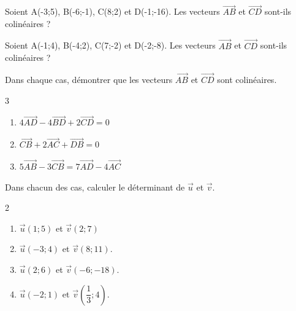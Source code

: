 {\begin{Exercice}
Soient A(-3;5), B(-6;-1), C(8;2) et D(-1;-16).
Les vecteurs $ \overrightarrow{AB} $ et $ \overrightarrow{CD} $ sont-ils colinéaires ?
\end{Exercice}



\begin{Exercice}
Soient A(-1;4), B(-4;2), C(7;-2) et D(-2;-8).
Les vecteurs $ \overrightarrow{AB} $ et $ \overrightarrow{CD} $ sont-ils colinéaires ?
\end{Exercice}

\newpage

\begin{Exercice}
Dans chaque cas, démontrer que les vecteurs $ \overrightarrow{AB} $ et $ \overrightarrow{CD} $ sont colinéaires.
\vspace{-0.5cm}
\begin{multicols}{3}
\begin{enumerate}
\item $ 4\overrightarrow{AD} -4\overrightarrow{BD} +2\overrightarrow{CD} = 0 $
\item $ \overrightarrow{CB}+2\overrightarrow{AC} + \overrightarrow{DB} = 0 $
\item $ 5\overrightarrow{AB}-3\overrightarrow{CB} = 7\overrightarrow{AD}-4\overrightarrow{AC} $
\end{enumerate}
\end{multicols}
\end{Exercice}

\begin{Exercice}
Dans chacun des cas, calculer le déterminant de $ \overrightarrow{u} $ et $ \overrightarrow{v} $.
\vspace{-0.5cm}
\begin{multicols}{2}
\begin{enumerate}
\item  $ \overrightarrow{u}(1;5) $ et $ \overrightarrow{v}(2;7) $
\item $ \overrightarrow{u}(-3;4) $ et $  \overrightarrow{v}(8;11) $.
\item $ \overrightarrow{u}(2;6) $ et $ \overrightarrow{v}(-6;-18) $.
\item $ \overrightarrow{u}(-2;1) $ et $ \overrightarrow{v} \left(  \dfrac{1}{3};4 \right)   $.
\end{enumerate}
\end{multicols}
\end{Exercice}



}
